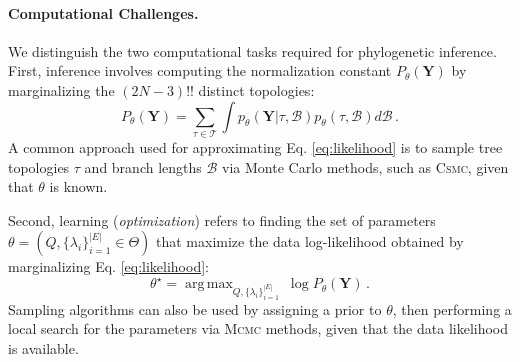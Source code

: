 \documentclass[accepted]{uai2021} %
\theoremstyle{definition}
\DeclareMathOperator*{\argmax}{arg\,max}
\begin{document}
\paragraph{Computational Challenges.} We distinguish the two computational tasks required for phylogenetic inference. First, inference involves computing the normalization constant $P_{\theta}(\mathbf{Y})$ by marginalizing the $(2N-3)!!$ distinct topologies:
    \begin{equation}
        P_\theta(\mathbf{Y}) = \sum\limits_{\tau \in \mathcal{T}}^{}\int p_\theta(\mathbf{Y}|\tau,\mathcal{B})p_\theta(\tau,\mathcal{B}) d\mathcal{B} \,.
        \label{eq:likelihood}
    \end{equation}
A common approach used for approximating Eq. \ref{eq:likelihood} is to sample tree topologies $\tau$ and branch lengths $\mathcal{B}$ via Monte Carlo methods, such as \textsc{Csmc}, given that $\theta$ is known.

Second, learning (\textit{optimization}) refers to finding the set of parameters $\theta = (Q,\{\lambda_i\}_{i=1}^{|E|} \in \Theta)$ that maximize the data log-likelihood obtained by marginalizing Eq. \ref{eq:likelihood}:
    \begin{equation}
        \theta^\star =  \argmax_{Q,\{\lambda_i\}_{i=1}^{|E|}} ~{\log P_\theta(\mathbf{Y})} \,. 
    \end{equation}
Sampling algorithms can also be used by assigning a prior to $\theta$, then performing a local search for the parameters via \textsc{Mcmc} methods, given that the data likelihood is available. 
\end{document}

